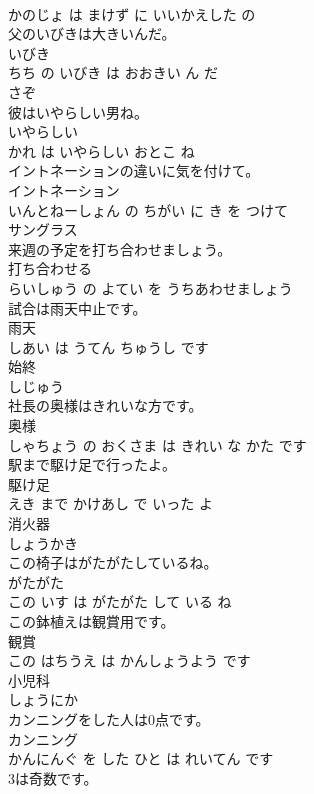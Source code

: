 \documentclass[8pt]{extreport}
\begin{document}
\begin{CJK}{UTF8}{min}
\\	かのじょ は まけず に いいかえした の			
\\	父のいびきは大きいんだ。	
\\	いびき 
\\	ちち の いびき は おおきい ん だ			
\\	さぞ	
\\	彼はいやらしい男ね。	
\\	いやらしい 
\\	かれ は いやらしい おとこ ね			
\\	イントネーションの違いに気を付けて。	
\\	イントネーション 
\\	いんとねーしょん の ちがい に き を つけて			
\\	サングラス	
\\	来週の予定を打ち合わせましょう。	
\\	打ち合わせる 
\\	らいしゅう の よてい を うちあわせましょう			
\\	試合は雨天中止です。	
\\	雨天 
\\	しあい は うてん ちゅうし です			
\\	始終	
\\	しじゅう		
\\	社長の奥様はきれいな方です。	
\\	奥様 
\\	しゃちょう の おくさま は きれい な かた です			
\\	駅まで駆け足で行ったよ。	
\\	駆け足 
\\	えき まで かけあし で いった よ			
\\	消火器	
\\	しょうかき		
\\	この椅子はがたがたしているね。	
\\	がたがた 
\\	この いす は がたがた して いる ね			
\\	この鉢植えは観賞用です。	
\\	観賞 
\\	この はちうえ は かんしょうよう です			
\\	小児科	
\\	しょうにか		
\\	カンニングをした人は0点です。	
\\	カンニング 
\\	かんにんぐ を した ひと は れいてん です			
\\	3は奇数です。	

\end{CJK}
\end{document}
